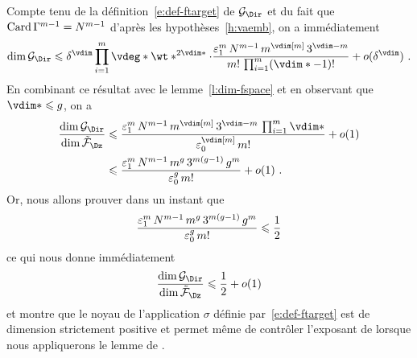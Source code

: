 Compte tenu de la définition~\eqref{e:def-ftarget} de \( \ftarget \) et du
fait que \( \operatorname{Card} \Gamma^{m-1} = N^{m-1} \) d'après les
hypothèses~\ref{h:vaemb}, on a immédiatement
\begin{equation}
  \dim \ftarget
  \le
  \delta^\vdim
  \prod\fctrange \vdeg* \wt*^{2\vdim*}
  \cdot
  \frac {
    \epsi^\puiss
    \, \nclmaps^{\puiss-1}
    \, \puiss^{\vdim[\puiss]}
    \, 3^{\vdim - \puiss}
  }{
    \puiss!
    \, \prod\fctrange (\vdim* - 1)!
  }
  + o(\delta^\vdim)
  \pmm.
\end{equation}
En combinant ce résultat avec le lemme~\ref{l:dim-fspace} et en observant que
\( \vdim* \le \genre \), on a
\begin{align}
  \frac {\dim \ftarget} {\dim \fspace}
  & \le
  \frac {
    \epsi^\puiss
    \, \nclmaps^{\puiss-1}
    \, \puiss^{\vdim[\puiss]}
    \, 3^{\vdim - \puiss}
    \, \prod\fctrange \vdim*
  }{
    \epsz^{\vdim[\puiss]}
    \, \puiss!
  }
  + o(1)
  \\ & \le
  \frac {
    \epsi^\puiss
    \, \nclmaps^{\puiss-1}
    \, \puiss ^{\genre}
    \, 3 ^{\puiss (\genre-1)}
    \, \genre^\puiss
  }{
    \epsz^\genre
    \, \puiss!
  }
  + o(1)
  \pmm.
\end{align}
Or, nous allons prouver dans un instant que
\begin{equation} \label{e:ct-eps*-siegel}
  \frac {
    \varepsilon\sb1^m
    \, N^{m-1}
    \, m ^{g}
    \, 3 ^{m (g-1)}
    \, g^m
  }{
    \varepsilon\sb0^g
    \, m!
  }
  \leqslant
  \frac12
\end{equation}
ce qui nous donne immédiatement
\begin{equation} \label{e:good-codim}
  \frac {\dim \ftarget} {\dim \fspace}
  \le
  \frac12
  + o(1)
\end{equation}
et montre que le noyau de l'application \( \sigma \) définie
par~\eqref{e:def-ftarget} est de dimension strictement positive et permet même
de contrôler l'exposant de  lorsque nous appliquerons le lemme
de \TS.

